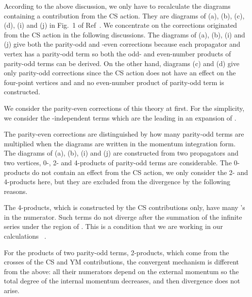 \documentclass[a4paper,12pt]{article}
\begin{document}
According to the above discussion,
we only have to recalculate the diagrams containing a contribution
from the CS action.
%
They are diagrams of (a), (b), (c), (d), (i) and (j) in Fig.~1
of Ref~\cite{Nittoh:2000it}.
%
We concentrate on the corrections originated from the CS action
in the following discussions.
%
%
The diagrams of (a), (b), (i) and (j) give
both the parity-odd and -even corrections
because each propagator and vertex has a parity-odd term
so both the odd- and even-number products of parity-odd terms
can be derived.
%
On the other hand,
diagrams (c) and (d) give only parity-odd corrections
since the CS action does not have an effect on the four-point vertices
\coordHE{} and \coordHE{}
and no even-number product of parity-odd term is constructed.




We consider the parity-even corrections of this theory at first.
%
For the simplicity, we consider the \myHighlight{$\Lambda$}\coordHE{}-independent terms
which are the leading
in an expansion of \myHighlight{$\Lambda$}\coordHE{}.

The parity-even corrections are distinguished by
how many parity-odd terms are multiplied
when the diagrams are written in the momentum integration form.
%
The diagrams of (a), (b), (i) and (j) are constructed from
two propagators and two vertices,
0-, 2- and 4-products of parity-odd terms are considerable.
%
The 0-products do not contain an effect from the CS action,
we only consider the 2- and 4-products here,
but they are excluded from the divergence
by the following reasons.

The 4-products, 
which is constructed by the CS contributions only,
have many \myHighlight{$\mu$}\coordHE{}'s in the numerator.
%
Such terms do not diverge after the summation of the infinite series
under the region of \coordHE{}.
%
This is a condition that we are working in our calculations%
~\cite{Nittoh:2001full}.

For the products of two parity-odd terms, 2-products,
which come from the crosses of the CS and YM contributions,
the convergent mechanism is different from the above:
%
all their numerators depend on the external momentum \coordHE{}
so the total degree of the internal momentum decreases,
and then divergence does not arise.
\end{document}
